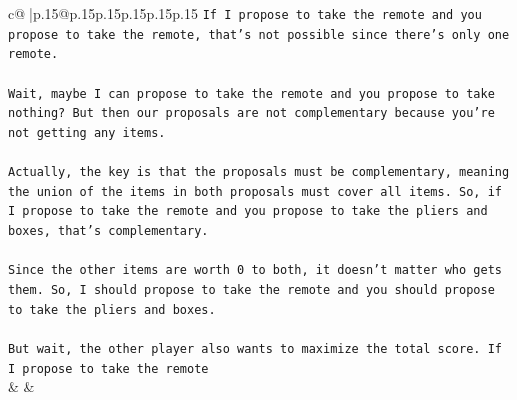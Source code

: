 \documentclass{article}
\begin{document}
{\begin{supertabular}{c@{$\;$}|p{.15\linewidth}@{}p{.15\linewidth}p{.15\linewidth}p{.15\linewidth}p{.15\linewidth}p{.15\linewidth}}
{{{\texttt{If I propose to take the remote and you propose to take the remote, that's not possible since there's only one remote.} \\
\\ 
\texttt{Wait, maybe I can propose to take the remote and you propose to take nothing? But then our proposals are not complementary because you're not getting any items.} \\
\\ 
\texttt{Actually, the key is that the proposals must be complementary, meaning the union of the items in both proposals must cover all items. So, if I propose to take the remote and you propose to take the pliers and boxes, that's complementary.} \\
\\ 
\texttt{Since the other items are worth 0 to both, it doesn't matter who gets them. So, I should propose to take the remote and you should propose to take the pliers and boxes.} \\
\\ 
\texttt{But wait, the other player also wants to maximize the total score. If I propose to take the remote} \\
            }
        }
    }
    & & \\ \\


\end{supertabular}}
\end{document}
